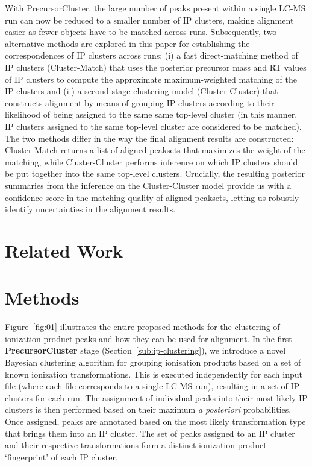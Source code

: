 With PrecursorCluster, the large number of peaks present within a single LC-MS run can now be reduced to a smaller number of IP clusters, making alignment easier as fewer objects have to be matched across runs. Subsequently, two alternative methods are explored in this paper for establishing the correspondences of IP clusters across runs: (i) a fast direct-matching method of IP clusters (Cluster-Match) that uses the posterior precursor mass and RT values of IP clusters to compute the approximate maximum-weighted matching of the IP clusters and (ii) a second-stage clustering model (Cluster-Cluster) that constructs alignment by means of grouping IP clusters according to their likelihood of being assigned to the same same top-level cluster (in this manner, IP clusters assigned to the same top-level cluster are considered to be matched). The two methods differ in the way the final alignment results are constructed: Cluster-Match returns a list of aligned peaksets that maximizes the weight of the matching, while Cluster-Cluster performs inference on which IP clusters should be put together into the same top-level clusters. Crucially, the resulting posterior summaries from the inference on the Cluster-Cluster model provide us with a confidence score in the matching quality of aligned peaksets, letting us robustly identify uncertainties in the alignment results. 

\section{Related Work}

\section{Methods}

Figure~\ref{fig:01} illustrates the entire proposed methods for the clustering of ionization product peaks and how they can be used for alignment. In the first \textbf{PrecursorCluster} stage (Section~\ref{sub:ip-clustering}), we introduce a novel Bayesian clustering algorithm for grouping ionisation products based on a set of known ionization transformations. This is executed independently for each input file (where each file corresponds to a single LC-MS run), resulting in a set of IP clusters for each run. The assignment of individual peaks into their most likely IP clusters is then performed based on their maximum \textit{a posteriori} probabilities. Once assigned, peaks are annotated based on the most likely transformation type that brings them into an IP cluster. The set of peaks assigned to an IP cluster and their respective transformations form a distinct ionization product `fingerprint' of each IP cluster. 

